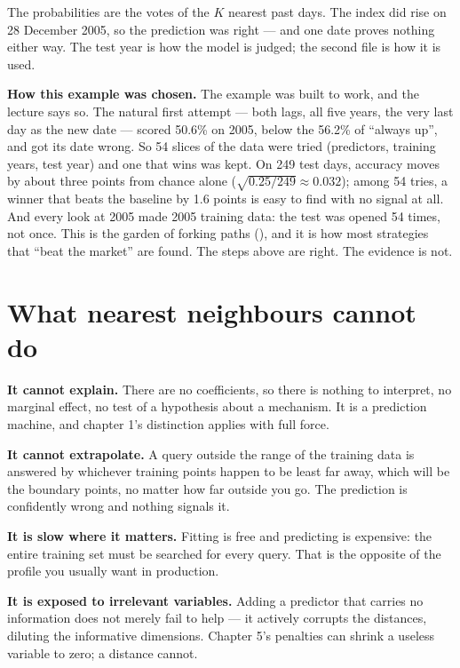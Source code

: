 \documentclass[
  letterpaper,
  10pt,
  twoside,
  openright,
  numbers=noenddot,
  chapterprefix=true]{scrbook}
\begin{document}
The probabilities are the votes of the \(K\) nearest past days. The
index did rise on 28 December 2005, so the prediction was right --- and
one date proves nothing either way. The test year is how the model is
judged; the second file is how it is used.

\begin{qmibwarn}

\textbf{How this example was chosen.} The example was built to work, and
the lecture says so. The natural first attempt --- both lags, all five
years, the very last day as the new date --- scored 50.6\% on 2005,
below the 56.2\% of ``always up'', and got its date wrong. So 54 slices
of the data were tried (predictors, training years, test year) and one
that wins was kept. On 249 test days, accuracy moves by about three
points from chance alone (\(\sqrt{0.25/249} \approx 0.032\)); among 54
tries, a winner that beats the baseline by 1.6 points is easy to find
with no signal at all. And every look at 2005 made 2005 training data:
the test was opened 54 times, not once. This is the garden of forking
paths (), and it is how
most strategies that ``beat the market'' are found. The steps above are
right. The evidence is not.

\end{qmibwarn}

\section{What nearest neighbours cannot
do}\label{what-nearest-neighbours-cannot-do}

\textbf{It cannot explain.} There are no coefficients, so there is
nothing to interpret, no marginal effect, no test of a hypothesis about
a mechanism. It is a prediction machine, and chapter 1's distinction
applies with full force.

\textbf{It cannot extrapolate.} A query outside the range of the
training data is answered by whichever training points happen to be
least far away, which will be the boundary points, no matter how far
outside you go. The prediction is confidently wrong and nothing signals
it.

\textbf{It is slow where it matters.} Fitting is free and predicting is
expensive: the entire training set must be searched for every query.
That is the opposite of the profile you usually want in production.

\textbf{It is exposed to irrelevant variables.} Adding a predictor that
carries no information does not merely fail to help --- it actively
corrupts the distances, diluting the informative dimensions. Chapter 5's
penalties can shrink a useless variable to zero; a distance cannot.
\end{document}
